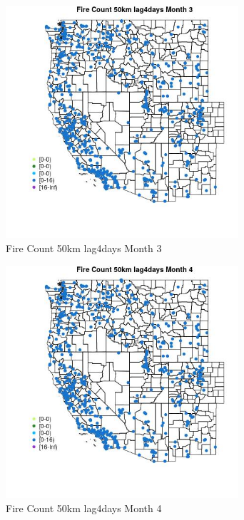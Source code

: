 \begin{figure} 
\centering  
\includegraphics[width=0.77\textwidth]{Code_Outputs/Report_ML_input_PM25_Step4_part_e_de_duplicated_aves_compiled_2019-05-21wNAs_MapObsMo3Fire_Count_50km_lag4days.jpg} 
\caption{\label{fig:Report_ML_input_PM25_Step4_part_e_de_duplicated_aves_compiled_2019-05-21wNAsMapObsMo3Fire_Count_50km_lag4days}Fire Count 50km lag4days Month 3} 
\end{figure} 
 

\clearpage 

\begin{figure} 
\centering  
\includegraphics[width=0.77\textwidth]{Code_Outputs/Report_ML_input_PM25_Step4_part_e_de_duplicated_aves_compiled_2019-05-21wNAs_MapObsMo4Fire_Count_50km_lag4days.jpg} 
\caption{\label{fig:Report_ML_input_PM25_Step4_part_e_de_duplicated_aves_compiled_2019-05-21wNAsMapObsMo4Fire_Count_50km_lag4days}Fire Count 50km lag4days Month 4} 
\end{figure} 
 

